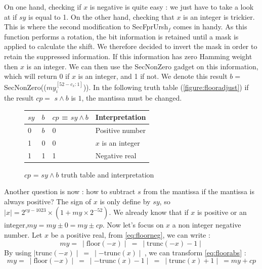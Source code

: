 \documentclass[runningheads]{llncs}
\begin{document}
    On one hand, checking if $x$ is negative is quite easy : we just have to take a look at if $sy$ is equal to 1.
    On the other hand, checking that $x$ is an integer is trickier. This is where the second modification to SecFprUrsh$_f$ comes in handy. As this function performs a rotation, the bit information is retained until a mask is applied to calculate the shift. 
    We therefore decided to invert the mask in order to retain the suppressed information. If this information has zero Hamming weight
    then $x$ is an integer. We can then use the SecNonZero gadget on this information, which will return $0$ if $x$ is an integer, and 1 if not.
    We denote this result $b=$ SecNonZero(($my_i^{[52 - c_x:1]}$)). 
    In the following truth table (\autoref{figure:flooradjust}) if the result $cp = $ $s\wedge b$ is $1$, the mantissa must be changed.
    \begin{figure}
        \begin{center}
            \begin{tabular}{C{0.5cm} C{0.5cm} || C{3 cm} L{3cm}}
              \toprule
                 $sy$ & $b$ &$cp$ = $sy \wedge b$ & Interpretation\\
               & $b$ & 0 & Positive number\\
                1 & 0  & 0 & $x$ is an integer\\
                1 & 1  & 1 & Negative real\\
              \bottomrule
            \end{tabular}
        \end{center}
        \caption{$cp$ = $sy\wedge b$ truth table and interpretation}
        \label{figure:flooradjust}
    \end{figure}
    Another question is now : how to subtract $s$ from the mantissa if the mantissa is always positive? 
    The sign of $x$ is only define by $sy$, so $\mid x\mid = 2^{ey-1023}\times(1 + my\times 2^{-52})$.
    We already know that if $x$ is positive or an integer,$my = my \pm 0 = my \pm cp$.
    Now let's focus on $x$ a non integer negative number. Let $x$ be a positive real, from \autoref{eq:floorneg}, we can write :
    \begin{equation}\label{eq:floorabs}
        my =\: \mid \text{floor}(-x)\mid \:=\: \mid \text{trunc}(-x) - 1\mid
    \end{equation}
    By using $\mid \text{trunc}(-x) \mid \:=\: \mid -\text{trunc}(x)\mid \:$, we can transform \autoref{eq:floorabs} :
    \begin{equation}\label{eq:floorabs2}
        my =\: \mid \text{floor}(-x)\mid \:=\: \mid -\text{trunc}(x) - 1\mid \:=\: \mid \text{trunc}(x) + 1\mid \:= my + cp
    \end{equation}
\end{document}
